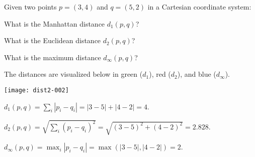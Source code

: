 
\begin{question}
Given two points $p = (3, 4)$ and
$q = (5, 2)$ in a Cartesian coordinate system:
\begin{answerlist}
  \item What is the Manhattan distance $d_1(p, q)$?
  \item What is the Euclidean distance $d_2(p, q)$?
  \item What is the maximum distance $d_\infty(p, q)$?
\end{answerlist}
\end{question}

\begin{solution}
The distances are visualized below in green ($d_1$), red ($d_2$),
and blue ($d_\infty$).

\texttt{[image: dist2-002]}

\begin{answerlist}
  \item $d_1(p, q) = \sum_i |p_i - q_i| = |3 - 5| +
    |4 - 2| = 4$.
  \item $d_2(p, q) = \sqrt{\sum_i (p_i - q_i)^2} = \sqrt{(3 -
    5)^2 + (4 - 2)^2} = 2.828$.
  \item $d_\infty(p, q) = \max_i |p_i - q_i| = \max(|3 -
    5|, |4 - 2|) = 2$.
\end{answerlist}
\end{solution}

